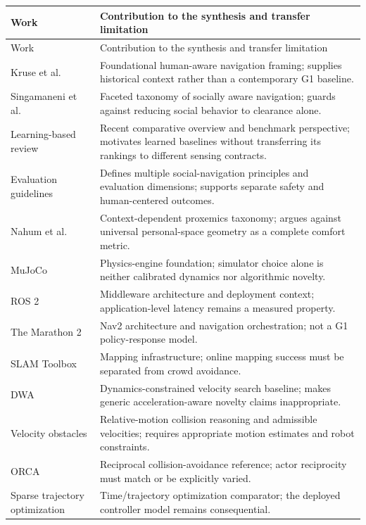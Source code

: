 \documentclass[11pt,a4paper]{article}
\begin{document}
\small
\begin{longtable}{P{0.28\textwidth}P{0.65\textwidth}}
\toprule
Work & Contribution to the synthesis and transfer limitation \\
\midrule
\endfirsthead
\toprule Work & Contribution to the synthesis and transfer limitation \\
\midrule
\endhead
\bottomrule
\endfoot
Kruse et al. \citep{survey2013} & Foundational human-aware navigation framing; supplies historical context rather than a contemporary G1 baseline. \\
Singamaneni et al. \citep{survey2024} & Faceted taxonomy of socially aware navigation; guards against reducing social behavior to clearance alone. \\
Learning-based review \citep{survey2023} & Recent comparative overview and benchmark perspective; motivates learned baselines without transferring its rankings to different sensing contracts. \\
Evaluation guidelines \citep{guidelines} & Defines multiple social-navigation principles and evaluation dimensions; supports separate safety and human-centered outcomes. \\
Nahum et al. \citep{proxemics2026} & Context-dependent proxemics taxonomy; argues against universal personal-space geometry as a complete comfort metric. \\
MuJoCo \citep{mujoco} & Physics-engine foundation; simulator choice alone is neither calibrated dynamics nor algorithmic novelty. \\
ROS 2 \citep{ros2} & Middleware architecture and deployment context; application-level latency remains a measured property. \\
The Marathon 2 \citep{nav2} & Nav2 architecture and navigation orchestration; not a G1 policy-response model. \\
SLAM Toolbox \citep{slam} & Mapping infrastructure; online mapping success must be separated from crowd avoidance. \\
DWA \citep{dwa} & Dynamics-constrained velocity search baseline; makes generic acceleration-aware novelty claims inappropriate. \\
Velocity obstacles \citep{vo} & Relative-motion collision reasoning and admissible velocities; requires appropriate motion estimates and robot constraints. \\
ORCA \citep{orca} & Reciprocal collision-avoidance reference; actor reciprocity must match or be explicitly varied. \\
Sparse trajectory optimization \citep{teb} & Time/trajectory optimization comparator; the deployed controller model remains consequential. \\

\end{longtable}
\end{document}
